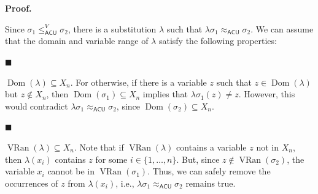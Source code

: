 \documentclass[10pt,a4paper]{amsart}
\begin{document}
 
\par\medskip\noindent\textbf{Proof.}\par
 
 
Since $\sigma_{1}\leq_{\mathsf{ACU}}^{V}\sigma_{2}$, there is a substitution $\lambda$ such that $\lambda\sigma_{1}\approx_{\mathsf{ACU}}\sigma_{2}$. We can assume that the domain and variable range of $\lambda$ satisfy the following properties:\par
  
\par\noindent  $\blacksquare$ 
 
$\operatorname{Dom}(\lambda)\subseteq X_{n}$. For otherwise, if there is a variable $z$ such that $z\in\operatorname{Dom}(\lambda)$ but $z\not\in X_{n}$, then $\operatorname{Dom}(\sigma_{1})\subseteq X_{n}$ implies that $\lambda\sigma_{1}(z)\neq z$. However, this would contradict $\lambda\sigma_{1}\approx_{\mathsf{ACU}}\sigma_{2}$, since $\operatorname{Dom}(\sigma_{2})\subseteq X_{n}$.\par
 
 
 
\par\noindent  $\blacksquare$ 
 
$\operatorname{VRan}(\lambda)\subseteq X_{n}$. Note that if $\operatorname{VRan}(\lambda)$ contains a variable $z$ not in $X_{n}$, then $\lambda(x_{i})$ contains $z$ for some $i\in\{1,\ldots,n\}$. But, since $z\not\in\operatorname{VRan}(\sigma_{2})$, the variable $x_{i}$ cannot be in $\operatorname{VRan}(\sigma_{1})$. Thus, we can safely remove the occurrences of $z$ from $\lambda(x_{i})$, i.e., $\lambda\sigma_{1}\approx_{\mathsf{ACU}}\sigma_{2}$ remains true.\par
 
 
\end{document}

